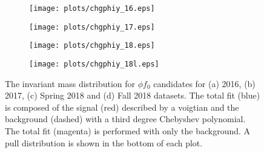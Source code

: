 \begin{center}
\null
\vfill
\begin{figure}[H]
    \centering
    \begin{subfigure}[b]{0.49\textwidth}
        \texttt{[image: plots/chgphiy\_16.eps]}
        \caption{}
        \label{fig.y2175.xsec_ul.yphifo.1.a}
    \end{subfigure}
    \begin{subfigure}[b]{0.49\textwidth}
        \texttt{[image: plots/chgphiy\_17.eps]}
        \caption{}
        \label{fig.y2175.xsec_ul.yphifo.1.b}
    \end{subfigure}
    \begin{subfigure}[b]{0.49\textwidth}
        \texttt{[image: plots/chgphiy\_18.eps]}
        \caption{}
        \label{fig.y2175.xsec_ul.yphifo.1.c}
    \end{subfigure}
    \begin{subfigure}[b]{0.49\textwidth}
        \texttt{[image: plots/chgphiy\_18l.eps]}
        \caption{}
        \label{fig.y2175.xsec_ul.yphifo.1.d}
    \end{subfigure}
    \caption{The invariant mass distribution for $\phi f_0$ candidates for (a) 2016, (b) 2017, (c) Spring 2018 and (d) Fall 2018 datasets. The total fit (blue) is composed of the signal (red) described by a voigtian and the background (dashed) with a third degree Chebyshev polynomial. The total fit (magenta) is performed with only the background. A pull distribution is shown in the bottom of each plot.}
    \label{fig.y2175.xsec_ul.yphifo.1}
\end{figure}
\null
\vfill
\end{center}

